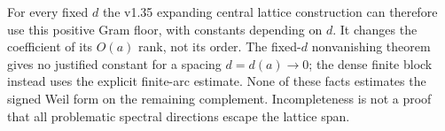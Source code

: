 For every fixed $d$ the v1.35 expanding central lattice construction
can therefore use this positive Gram floor, with constants depending
on $d$. It changes the coefficient of its $O(a)$ rank, not its order.
The fixed-$d$ nonvanishing theorem gives no justified constant for a
spacing $d=d(a)\to0$; the dense finite block instead uses the explicit
finite-arc estimate. None of these facts estimates the signed Weil
form on the remaining complement. Incompleteness is not a proof that
all problematic spectral directions escape the lattice span.
